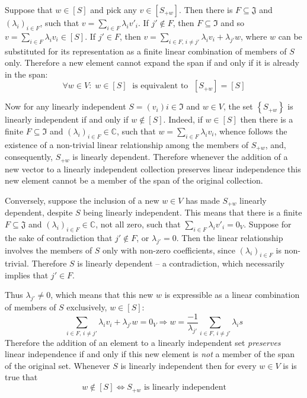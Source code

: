 \documentclass[a4paper]{article}
\newcommand{\obj}[1]{\ensuremath{\left\{ #1 \right\}}}
\newcommand{\brac}[1]{\ensuremath{\left( #1 \right)}}
\newcommand{\spn}[1]{\ensuremath{\left[ #1 \right]}}
\begin{document}
Suppose that $w\in \spn{S}$ and pick any $v\in \spn{S_{+w}}$. Then there is $F\subseteq \mathfrak{J}$ and $\brac{\lambda_i}_{i\in F}$, such that $v=\sum_{i\in F}\lambda_i v'_i$. If $j'\notin F$, then $F\subseteq \mathfrak{I}$ and so $v=\sum_{i\in F} \lambda_i v_i\in \spn{S}$. If $j'\in F$, then $v=\sum_{i\in F,\,i\neq j'} \lambda_i v_i + \lambda_{j'} w$, where $w$ can be substituted for its representation as a finite linear combination of members of $S$ only. Therefore a new element cannot expand the span if and only if it is already in the span:\[\forall{w\in V}:\; w\in \spn{S}\; \text{ is equivalent to }\; \spn{S_{+w}} = \spn{S}\]

Now for any linearly independent $S=\brac{v_i}{i\in\mathfrak{I}}$ and $w\in V$, the set $\obj{S_{+w}}$ is linearly independent if and only if $w \notin \spn{S}$. Indeed, if $w\in \spn{S}$ then there is a finite $F\subseteq\mathfrak{I}$ and $\brac{\lambda_i}_{i\in F} \in \mathbb{C}$, such that $w = \sum_{i\in F} \lambda_i v_i$, whence follows the existence of a non-trivial linear relationship among the members of $S_{+w}$, and, consequently, $S_{+w}$ is linearly dependent. Therefore whenever the addition of a new vector to a linearly independent collection preserves linear independence this new element cannot be a member of the span of the original collection.

Conversely, suppose the inclusion of a new $w\in V$ has made $S_{+w}$ linearly dependent, despite $S$ being linearly independent. This means that there is a finite $F\subseteq \mathfrak{J}$ and $\brac{\lambda_i}_{i\in F}\in \mathbb{C}$, not all zero, such that $\sum_{i\in F} \lambda_i v'_i = 0_V$. Suppose for the sake of contradiction that $j'\notin F$, or $\lambda_{j'}=0$. Then the linear relationship involves the members of $S$ only with non-zero coefficients, since $\brac{\lambda_i}_{i\in F}$ is non-trivial. Therefore $S$ is linearly dependent -- a contradiction, which necessarily implies that $j'\in F$.

Thus $\lambda_{j'}\neq 0$, which means that this new $w$ is expressible as a linear combination of members of $S$ exclusively, $w \in \spn{S}$:\[\sum_{i\in F,\,i\neq j'} \lambda_i v_i + \lambda_{j'} w = 0_V \Rightarrow w = \frac{-1}{\lambda_{j'}} \sum_{i\in F,\,i\neq j'} \lambda_i s\] Therefore the addition of an element to a linearly independent set \emph{preserves} linear independence if and only if this new element is \emph{not} a member of the span of the original set. Whenever $S$ is linearly independent then for every $w\in V$ is is true that \[w\notin \spn{S} \Leftrightarrow S_{+w}\text{ is linearly independent}\]
\end{document}
